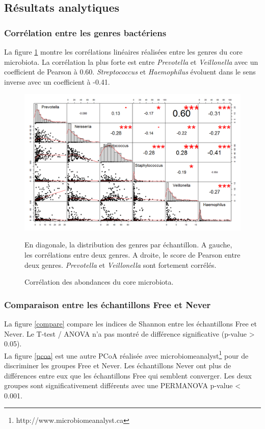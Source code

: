 \documentclass[12pt,a4paper]{article}
\begin{document}
\subsection{Résultats analytiques}
\subsubsection{Corrélation entre les genres bactériens}
La figure \ref{correlation} montre les corrélations linéaires réalisées entre les genres du core microbiota. La corrélation la plus forte est entre \textit{Prevotella} et \textit{Veillonella} avec un coefficient de Pearson à 0.60.  \textit{Streptococcus} et \textit{Haemophilus} évoluent dans le sens inverse avec un coefficient à -0.41.


\begin{figure}
\begin{center}
\includegraphics[scale=0.50]{img/small_correlation.png}\hfill
\end{center}
\caption{Corrélation des abondances du core microbiota.}
En diagonale, la distribution des genres par échantillon. A gauche, les corrélations entre deux genres. A droite, le score de Pearson entre deux genres. \textit{Prevotella} et \textit{Veillonella} sont fortement corrélés.
\label{correlation}
\end{figure}

\subsubsection{Comparaison entre les échantillons Free et Never}
La figure \ref{compare} compare les indices de Shannon entre les échantillons Free et Never. Le T-test / ANOVA n'a pas montré de différence significative (p-value > 0.05). \\
La figure  \ref{pcoa} est une autre PCoA réalisée avec microbiomeanalyst\footnote{http://www.microbiomeanalyst.ca} pour de discriminer les groupes Free et Never. Les échantillons Never ont plus de différences entre eux que les échantillons Free qui semblent converger. Les deux groupes sont significativement différents avec une PERMANOVA p-value < 0.001.
\end{document}
